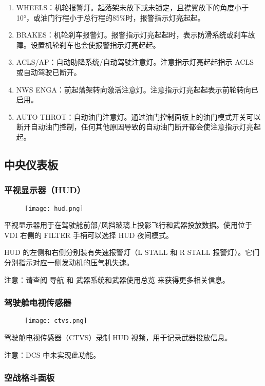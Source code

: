 \begin{enumerate}
	\item WHEELS：机轮报警灯。起落架未放下或未锁定，且襟翼放下的角度小于10°，或油门行程小于总行程的85\%时，报警指示灯亮起起。
	\item BRAKES：机轮刹车报警灯。报警指示灯亮起起时，表示防滑系统或刹车故障。设置机轮刹车也会使报警指示灯亮起起。
	\item ACLS/AP：自动助降系统/自动驾驶注意灯。注意指示灯亮起起指示 ACLS 或自动驾驶已断开。
	\item NWS ENGA：前起落架转向激活注意灯。注意指示灯亮起起表示前轮转向已启用。
	\item AUTO THROT：自动油门注意灯。通过油门控制面板上的油门模式开关可以断开自动油门控制，任何其他原因导致的自动油门断开都会使注意指示灯亮起起。
\end{enumerate}


\subsection{中央仪表板}

\subsubsection{平视显示器（HUD）}

\begin{figure}[htb]
	\centering
	\texttt{[image: hud.png]}
\end{figure}
平视显示器用于在驾驶舱前部/风挡玻璃上投影飞行和武器投放数据。使用位于 VDI 右侧的 FILTER 手柄可以选择 HUD 夜间模式。

HUD 的左侧和右侧分别装有失速报警灯（L STALL 和 R STALL 报警灯）。它们分别指示对应一侧发动机的压气机失速。

注意：请查阅 导航 和 武器系统和武器使用总览 来获得更多相关信息。

\subsubsection{驾驶舱电视传感器}

\begin{figure}[htb]
	\centering
	\texttt{[image: ctvs.png]}
\end{figure}
驾驶舱电视传感器（CTVS）录制 HUD 视频，用于记录武器投放信息。

注意：DCS 中未实现此功能。

\subsubsection{空战格斗面板}

